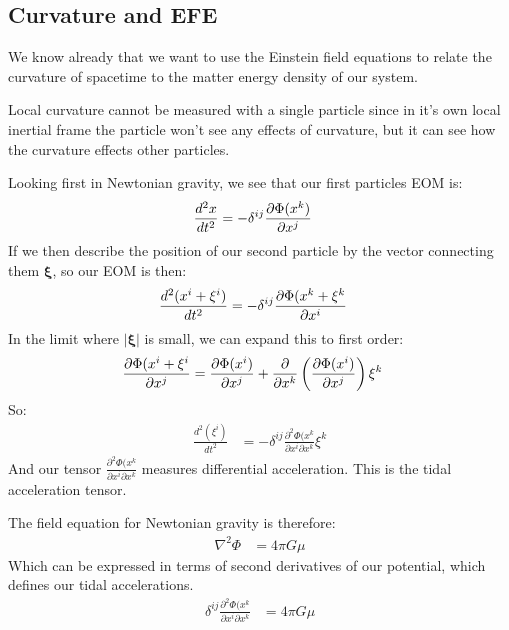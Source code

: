 \subsection{Curvature and EFE}
We know already that we want to use the Einstein field equations to relate the curvature of spacetime to the matter energy density of our system.

Local curvature cannot be measured with a single particle since in it's own local inertial frame the particle won't see any effects of curvature, but it can see how the curvature effects other particles.

Looking first in Newtonian gravity, we see that our first particles EOM is:
\begin{align*}
	\frac{d^2x}{dt^2} &= -\delta^{ij}\frac{\partial \Phi(x^k)}{\partial x^j}
\end{align*}
If we then describe the position of our second particle by the vector connecting them $\bm{\xi}$, so our EOM is then:
\begin{align*}
	\frac{d^2(x^i +\xi^i)}{dt^2} &= -\delta^{ij} \frac{\partial \Phi(x^k + \xi^k}{\partial x^i}
\end{align*}
In the limit where $|\bm{\xi}|$ is small, we can expand this to first order:
\begin{align*}
	\frac{\partial \Phi(x^i + \xi^i}{\partial x^j} &= \frac{\partial \Phi(x^i)}{\partial x^j} + \frac{\partial }{\partial x^k}\left(\frac{\partial \Phi(x^i)}{\partial x^j}\right)\xi^k
\end{align*}
So:
\begin{align*}
	\frac{d^2(\xi^i)}{dt^2} &= -\delta^{ij} \frac{\partial^2\Phi(x^k}{\partial x^i\partial x^k}\xi^k
\end{align*}
And our tensor $\frac{\partial^2\Phi(x^k}{\partial x^i\partial x^k}$ measures differential acceleration. This is the tidal acceleration tensor.

The field equation for Newtonian gravity is therefore:
\begin{align*}
	\nabla^2\Phi &= 4\pi G\mu
\end{align*}
Which can be expressed in terms of second derivatives of our potential, which defines our tidal accelerations.
\begin{align*}
	\delta^{ij} \frac{\partial^2\Phi(x^k}{\partial x^i\partial x^k} &= 4\pi G\mu
\end{align*}
